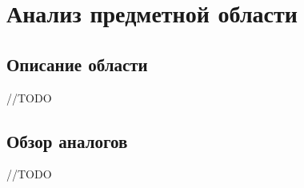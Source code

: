 \section{Анализ предметной области}

\subsection{Описание области}
    //TODO

\subsection{Обзор аналогов}
    //TODO
    
        
\clearpage